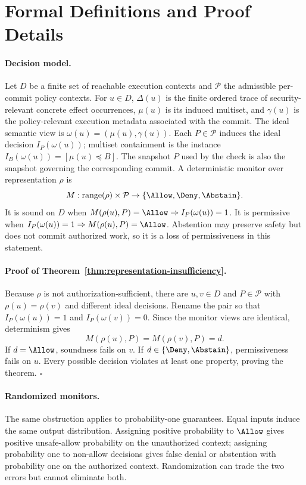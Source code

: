 \section{Formal Definitions and Proof Details}
\label{app:formal-proofs}

\paragraph{Decision model.}
Let $D$ be a finite set of reachable execution contexts and $\mathcal{P}$ the
admissible per-commit policy contexts.  For $u\in D$, $\Delta(u)$ is
the finite ordered trace of security-relevant concrete effect occurrences,
$\mu(u)$ is its induced multiset, and $\gamma(u)$ is the policy-relevant
execution metadata associated with the commit.  The ideal semantic view is
$\omega(u)=(\mu(u),\gamma(u))$.  Each $P\in\mathcal P$ induces the ideal
decision $I_P(\omega(u))$; multiset containment is the instance
$I_B(\omega(u))=[\mu(u)\preceq B]$.  The snapshot $P$ used by the check is also the
snapshot governing the corresponding commit.  A deterministic monitor over
representation
$\rho$ is
\[
  M:\mathrm{range}(\rho)\times\mathcal P
  \rightarrow\{\Allow,\Deny,\Abstain\}.
\]
It is sound on $D$ when $M(\rho(u),P)=\Allow\Rightarrow I_P(\omega(u))=1$.
It is permissive when $I_P(\omega(u))=1\Rightarrow
M(\rho(u),P)=\Allow$.  Abstention may
preserve safety but does not commit authorized work, so it is a loss of
permissiveness in this statement.

\paragraph{Proof of Theorem~\ref{thm:representation-insufficiency}.}
Because $\rho$ is not authorization-sufficient, there are $u,v\in D$ and
$P\in\mathcal P$ with $\rho(u)=\rho(v)$ and different ideal decisions. Rename
the pair so that $I_P(\omega(u))=1$ and $I_P(\omega(v))=0$. Since the monitor views are
identical, determinism gives
\[
 M(\rho(u),P)=M(\rho(v),P)=d.
\]
If $d=\Allow$, soundness fails on $v$. If $d\in\{\Deny,\Abstain\}$,
permissiveness fails on $u$. Every possible decision violates at least one
property, proving the theorem. \hfill$\square$

\paragraph{Randomized monitors.}
The same obstruction applies to probability-one guarantees. Equal inputs
induce the same output distribution. Assigning positive probability to
$\Allow$ gives positive unsafe-allow probability on the unauthorized context;
assigning probability one to non-allow decisions gives false denial or
abstention with probability one on the authorized context. Randomization can
trade the two errors but cannot eliminate both.

